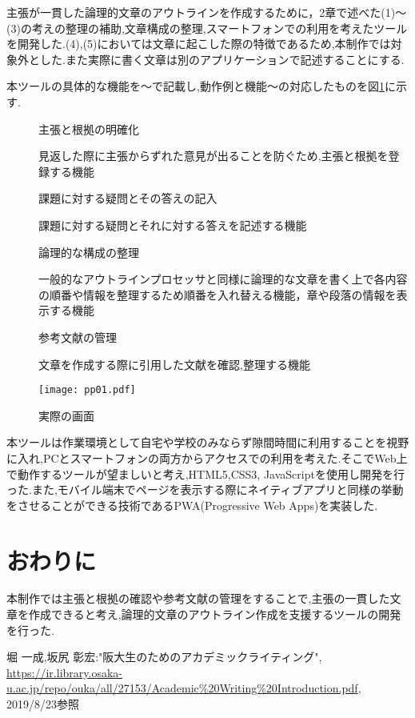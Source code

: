 \documentclass[twocolumn,10pt,a4j]{jsarticle}
\begin{document}
主張が一貫した論理的文章のアウトラインを作成するために，2章で述べた(1)〜(3)の考えの整理の補助,文章構成の整理,スマートフォンでの利用を考えたツールを開発した.(4),(5)においては文章に起こした際の特徴であるため,本制作では対象外とした.また実際に書く文章は別のアプリケーションで記述することにする.

本ツールの具体的な機能を〜で記載し,動作例と機能〜の対応したものを図\ref{fig:g}に示す.
\begin{description}
  \item[]主張と根拠の明確化
  
 見返した際に主張からずれた意見が出ることを防ぐため,主張と根拠を登録する機能
  
  \item[]課題に対する疑問とその答えの記入
  
課題に対する疑問とそれに対する答えを記述する機能
  
  \item[]論理的な構成の整理
  
  一般的なアウトラインプロセッサと同様に論理的な文章を書く上で各内容の順番や情報を整理するため順番を入れ替える機能，章や段落の情報を表示する機能
  
  \item[]参考文献の管理
  
  文章を作成する際に引用した文献を確認,整理する機能 
  
  
\end{description}

\begin{figure}[h]
\begin{center}
 \texttt{[image: pp01.pdf]}
\end{center}
 \caption{実際の画面}
 \label{fig:g}
\end{figure}

本ツールは作業環境として自宅や学校のみならず隙間時間に利用することを視野に入れ,PCとスマートフォンの両方からアクセスでの利用を考えた.そこでWeb上で動作するツールが望ましいと考え,HTML5,CSS3, JavaScriptを使用し開発を行った.また,モバイル端末でページを表示する際にネイティブアプリと同様の挙動をさせることができる技術であるPWA(Progressive Web Apps)を実装した.
\section{おわりに}
本制作では主張と根拠の確認や参考文献の管理をすることで,主張の一貫した文章を作成できると考え,論理的文章のアウトライン作成を支援するツールの開発を行った.

\begin{thebibliography}{99}
 堀 一成,坂尻 彰宏:"阪大生のためのアカデミックライティング",
\url{https://ir.library.osaka-u.ac.jp/repo/ouka/all/27153/Academic%20Writing%20Introduction.pdf}, 2019/8/23参照


\end{thebibliography}
\end{document}
